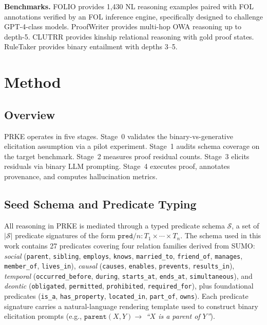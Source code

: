 \documentclass[11pt,letterpaper]{article}
\begin{document}
\noindent\textbf{Benchmarks.}
FOLIO \citep{Han2022} provides 1,430 NL reasoning examples paired with FOL annotations verified by an FOL inference engine, specifically designed to challenge GPT-4-class models. ProofWriter \citep{Tafjord2021} provides multi-hop OWA reasoning up to depth-5. CLUTRR \citep{Sinha2019} provides kinship relational reasoning with gold proof states. RuleTaker \citep{Clark2020} provides binary entailment with depths 3--5.

\section{Method}
\label{sec:method}

\subsection{Overview}

PRKE operates in five stages. Stage~0 validates the binary-vs-generative elicitation assumption via a pilot experiment. Stage~1 audits schema coverage on the target benchmark. Stage~2 measures proof residual counts. Stage~3 elicits residuals via binary LLM prompting. Stage~4 executes proof, annotates provenance, and computes hallucination metrics.

\subsection{Seed Schema and Predicate Typing}

All reasoning in PRKE is mediated through a typed predicate schema $\mathcal{S}$, a set of $|\mathcal{S}|$ predicate signatures of the form $\mathtt{pred}/n : T_1 \times \cdots \times T_n$. The schema used in this work contains 27 predicates covering four relation families derived from SUMO: \emph{social} (\texttt{parent}, \texttt{sibling}, \texttt{employs}, \texttt{knows}, \texttt{married\_to}, \texttt{friend\_of}, \texttt{manages}, \texttt{member\_of}, \texttt{lives\_in}), \emph{causal} (\texttt{causes}, \texttt{enables}, \texttt{prevents}, \texttt{results\_in}), \emph{temporal} (\texttt{occurred\_before}, \texttt{during}, \texttt{starts\_at}, \texttt{ends\_at}, \texttt{simultaneous}), and \emph{deontic} (\texttt{obligated}, \texttt{permitted}, \texttt{prohibited}, \texttt{required\_for}), plus foundational predicates (\texttt{is\_a}, \texttt{has\_property}, \texttt{located\_in}, \texttt{part\_of}, \texttt{owns}). Each predicate signature carries a natural-language rendering template used to construct binary elicitation prompts (e.g., $\mathtt{parent}(X,Y) \rightarrow$ \textit{``$X$ is a parent of $Y$''}).
\end{document}
